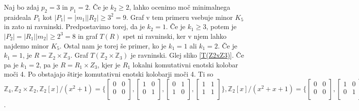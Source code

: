 \documentclass[a4paper, 12pt]{amsart}
\theoremstyle{definition} %
\theoremstyle{plain} %
\newcommand{\Z}{\mathbb Z}
\begin{document}
\begin{enumerate}
Naj bo zdaj $p_2 = 3$ in $p_1 = 2$. Če je $k_2 \ge 2$, lahko ocenimo moč minimalnega praideala $P_1$ kot $|P_1| = |m_1||R_2| \ge 3^2 = 9$. Graf v tem primeru vsebuje minor $K_5$ in zato ni ravninski. Predpostavimo torej, da je $k_2 = 1$. Če je $k_1 \ge 3$, potem je $|P_2| = |R_1||m_2| \ge 2^3 = 8$ in graf $T(R)$ spet ni ravninski, ker v njem lahko najdemo minor $K_5$. Ostal nam je torej še primer, ko je $k_1= 1$ ali $k_1=2$. Če je $k_1= 1$, je $R= \Z_2 \times \Z_3$. Graf $T(\Z_2 \times \Z_3)$ je ravninski. Glej sliko \ref{T(Z2xZ3)}. Če pa je $k_1 = 2$, pa je $R = R_1 \times Z_3$, kjer je $R_1$ lokalni komutativni enotski kolobar moči 4. Po \cite{Dresden-smallRings} obstajajo štirje komutativni enotski kolobarji moči 4. Ti so $\Z_4, \Z_2 \times \Z_2, \Z_2[x]/(x^2 + 1) = \big\{
\begin{bmatrix}
0 & 0 \\
0 & 0 \\
\end{bmatrix},
\begin{bmatrix}
1 & 0 \\
0 & 1 \\
\end{bmatrix},
\begin{bmatrix}
0 & 1 \\
1 & 0 \\
\end{bmatrix},
\begin{bmatrix}
1 & 1 \\
1 & 1 \\
\end{bmatrix} \big\}, 
\Z_2[x]/(x^2  + x +1) = \big\{
\begin{bmatrix}
0 & 0 \\
0 & 0 \\
\end{bmatrix},
\begin{bmatrix}
1 & 0 \\
0 & 1 \\
\end{bmatrix},
\begin{bmatrix}
1 & 1 \\
1 & 0 \\
\end{bmatrix},
\begin{bmatrix}
0 & 1 \\
1 & 1 \\
\end{bmatrix} \big\}
$. 

\end{enumerate}
\end{document}
